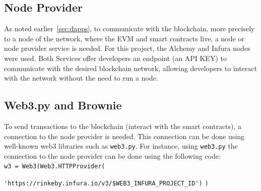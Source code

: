 \documentclass[11pt,a4paper]{report}
\begin{document}
\subsection{Node Provider}
As noted earlier~\ref{sec:dapps}, to communicate with the blockchain, more precisely to a node of the network, where the EVM and smart contracts live, a node or node provider service is needed. For this project, the Alchemy\cite{alchemy} and Infura\cite{infura} nodes were used. Both Services offer developers an endpoint (an API KEY) to communicate with the desired blockchain network, allowing developers to interact with the network without the need to run a node.
\subsection{Web3.py and Brownie}\label{brownie}
To send transactions to the blockchain (interact with the smart contracts), a connection to the node provider is needed. This connection can be done using well-known web3 libraries such as \verb|web3.py|\cite{web3py}. For instance, using \verb|web3.py| the connection to the node provider can be done using the following code:\\
\verb|w3 = Web3(Web3.HTTPProvider(|

\hspace{1cm}\verb|'https://rinkeby.infura.io/v3/$WEB3_INFURA_PROJECT_ID')| \verb|)|
\end{document}
